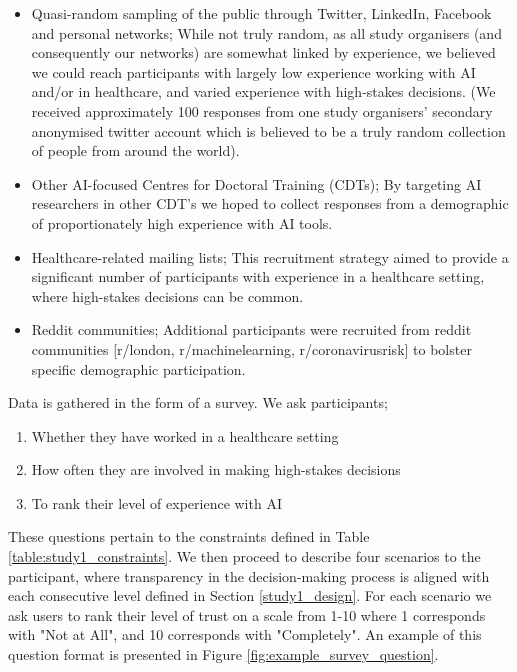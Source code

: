 \documentclass[manuscript,screen,review]{acmart}
\begin{document}
\begin{itemize}
    \item Quasi-random sampling of the public through Twitter, LinkedIn, Facebook and personal networks; While not truly random, as all study organisers (and consequently our networks) are somewhat linked by experience, we believed we could reach participants with largely low experience working with AI and/or in healthcare, and varied experience with high-stakes decisions. (We received approximately 100 responses from one study organisers' secondary anonymised twitter account which is believed to be a truly random collection of people from around the world).
    \item Other AI-focused Centres for Doctoral Training (CDTs); By targeting AI researchers in other CDT's we hoped to collect responses from a demographic of proportionately high experience with AI tools.
    \item Healthcare-related mailing lists; This recruitment strategy aimed to provide a significant number of participants with experience in a healthcare setting, where high-stakes decisions can be common.
    \item Reddit communities; Additional participants were recruited from reddit communities [r/london, r/machinelearning, r/coronavirusrisk] to bolster specific demographic participation.
\end{itemize}

Data is gathered in the form of a survey. We ask participants;

\begin{enumerate}
    \item Whether they have worked in a healthcare setting
    \item How often they are involved in making high-stakes decisions
    \item To rank their level of experience with AI
\end{enumerate}

These questions pertain to the constraints defined in Table \ref{table:study1_constraints}. We then proceed to describe four scenarios to the participant, where transparency in the decision-making process is aligned with each consecutive level defined in Section \ref{study1_design}. For each scenario we ask users to rank their level of trust on a scale from 1-10 where 1 corresponds with "Not at All", and 10 corresponds with "Completely". An example of this question format is presented in Figure \ref{fig:example_survey_question}.
\end{document}
